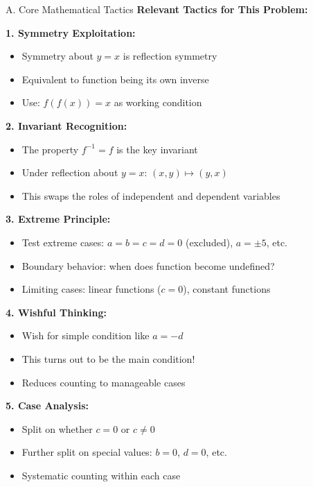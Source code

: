 \documentclass[12pt]{article}
\begin{document}
\begin{tacticsbox}{A. Core Mathematical Tactics}
\textbf{Relevant Tactics for This Problem:}

\textbf{1. Symmetry Exploitation:}
\begin{itemize}
    \item Symmetry about $y=x$ is reflection symmetry
    \item Equivalent to function being its own inverse
    \item Use: $f(f(x)) = x$ as working condition
\end{itemize}

\textbf{2. Invariant Recognition:}
\begin{itemize}
    \item The property $f^{-1} = f$ is the key invariant
    \item Under reflection about $y=x$: $(x,y) \mapsto (y,x)$
    \item This swaps the roles of independent and dependent variables
\end{itemize}

\textbf{3. Extreme Principle:}
\begin{itemize}
    \item Test extreme cases: $a=b=c=d=0$ (excluded), $a=\pm 5$, etc.
    \item Boundary behavior: when does function become undefined?
    \item Limiting cases: linear functions ($c=0$), constant functions
\end{itemize}

\textbf{4. Wishful Thinking:}
\begin{itemize}
    \item Wish for simple condition like $a=-d$
    \item This turns out to be the main condition!
    \item Reduces counting to manageable cases
\end{itemize}

\textbf{5. Case Analysis:}
\begin{itemize}
    \item Split on whether $c=0$ or $c \neq 0$
    \item Further split on special values: $b=0$, $d=0$, etc.
    \item Systematic counting within each case
\end{itemize}
\end{tacticsbox}
\end{document}
